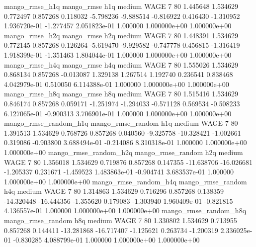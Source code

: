        mango_rmse_h1q        mango_rmse                  h1q     medium     WAGE                 7 80  1.445648       1.534629 0.772497       0.857268    0.118032     -5.798236     -9.888514    -0.816922       0.416430 -1.310952 1.936720e-01    -1.277457   2.051823e-01            1.000000    1.000000e+00        1.000000e+00
       mango_rmse_h2q        mango_rmse                  h2q     medium     WAGE                 7 80  1.448391       1.534629 0.772145       0.857268    0.126264     -5.619470     -9.929582    -0.747778       0.456815 -1.316419 1.918399e-01    -1.351463   1.804044e-01            1.000000    1.000000e+00        1.000000e+00
       mango_rmse_h4q        mango_rmse                  h4q     medium     WAGE                 7 80  1.555026       1.534629 0.868134       0.857268   -0.013087      1.329138      1.267514     1.192740       0.236541  0.838468 4.042979e-01     0.510050   6.114388e-01            1.000000    1.000000e+00        1.000000e+00
       mango_rmse_h8q        mango_rmse                  h8q     medium     WAGE                 7 80  1.515416       1.534629 0.846174       0.857268    0.059171     -1.251974     -1.294033    -0.571128       0.569534 -0.508233 6.127065e-01    -0.900313   3.706901e-01            1.000000    1.000000e+00        1.000000e+00
mango_rmse_random_h1q mango_rmse_random                  h1q     medium     WAGE                 7 80  1.391513       1.534629 0.768726       0.857268    0.040560     -9.325758    -10.328421    -1.002661       0.319086 -0.903800 3.688494e-01    -0.214086   8.310318e-01            1.000000    1.000000e+00        1.000000e+00
mango_rmse_random_h2q mango_rmse_random                  h2q     medium     WAGE                 7 80  1.356018       1.534629 0.719876       0.857268    0.147355    -11.638706    -16.026681    -1.205337       0.231671 -1.459523 1.483863e-01    -0.904741   3.683537e-01            1.000000    1.000000e+00        1.000000e+00
mango_rmse_random_h4q mango_rmse_random                  h4q     medium     WAGE                 7 80  1.314863       1.534629 0.716296       0.857268    0.138359    -14.320448    -16.444356    -1.355620       0.179083 -1.303940 1.960409e-01    -0.821815   4.136557e-01            1.000000    1.000000e+00        1.000000e+00
mango_rmse_random_h8q mango_rmse_random                  h8q     medium     WAGE                 7 80  1.330802       1.534629 0.713955       0.857268    0.144411    -13.281868    -16.717407    -1.125621       0.263734 -1.200319 2.336025e-01    -0.830285   4.088799e-01            1.000000    1.000000e+00        1.000000e+00
